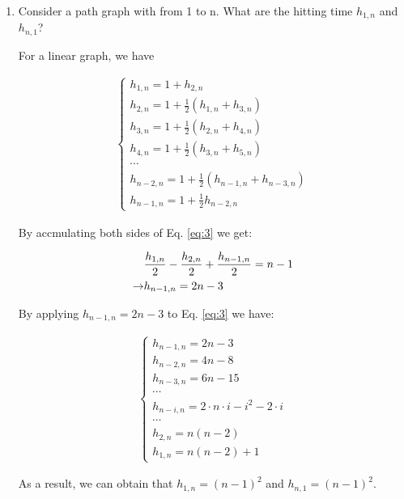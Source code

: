 \begin{problem}[30 points]
\begin{enumerate}
  \item Consider a path graph with from 1 to n. What are the hitting time $h_{1,n}$ and $h_{n,1}$?
  
  \Answer

  For a linear graph, we have

  \begin{align}\label{eq:3}
  \begin{cases}
    h_{1,n} = 1+h_{2,n} \\
    h_{2,n} =1+ \frac{1}{2}(h_{1,n}+h_{3,n})\\
    h_{3,n} =1+ \frac{1}{2}(h_{2,n}+h_{4,n})\\
    h_{4,n} =1+ \frac{1}{2}(h_{3,n}+h_{5,n})\\
    \cdots\\
    h_{n-2,n} =1+ \frac{1}{2}(h_{n-1,n}+h_{n-3,n})\\
    h_{n-1,n} =1+ \frac{1}{2}h_{n-2,n}
  \end{cases}
  \end{align}
  
  By accmulating both sides of Eq. \eqref{eq:3} we get:

  \begin{align}
  &  \frac{h_{1,n}}{2}-\frac{h_{2,n}}{2}+\frac{h_{n-1,n}}{2} = n-1 \notag \\
   \rightarrow &h_{n-1,n} = 2n-3
  \end{align}

  By applying $h_{n-1,n} = 2n-3$ to Eq. \eqref{eq:3} we have:
  
  \begin{align}\label{eq:4}
  \begin{cases}
    h_{n-1,n} = 2n-3 \\
    h_{n-2,n} =4n-8\\
    h_{n-3,n} =6n-15\\
    \cdots\\
    h_{n-i,n} =2 \cdot n \cdot i - i^2 -2 \cdot i\\
    \cdots\\
    h_{2,n} =n(n-2)\\
    h_{1,n} =n(n-2)+1
  \end{cases}
  \end{align}

As a result, we can obtain that $h_{1,n} =(n-1)^2$ and $h_{n,1} =(n-1)^2$.
  
  
\end{enumerate}

\end{problem}

